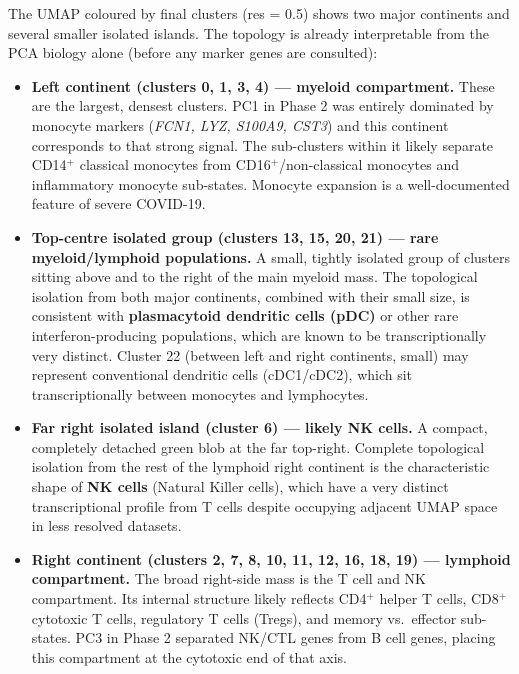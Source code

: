\documentclass[11pt, a4paper]{article}
\begin{document}
The UMAP coloured by final clusters (res = 0.5) shows two major continents and
several smaller isolated islands. The topology is already interpretable from the
PCA biology alone (before any marker genes are consulted):

\begin{itemize}[nosep]
  \item \textbf{Left continent (clusters 0, 1, 3, 4) — myeloid compartment.}
        These are the largest, densest clusters. PC1 in Phase 2 was entirely
        dominated by monocyte markers (\textit{FCN1, LYZ, S100A9, CST3}) and
        this continent corresponds to that strong signal. The sub-clusters within
        it likely separate CD14$^+$ classical monocytes from CD16$^+$/non-classical
        monocytes and inflammatory monocyte sub-states. Monocyte expansion is
        a well-documented feature of severe COVID-19.

  \item \textbf{Top-centre isolated group (clusters 13, 15, 20, 21) — rare
        myeloid/lymphoid populations.}
        A small, tightly isolated group of clusters sitting above and to the right
        of the main myeloid mass. The topological isolation from both major
        continents, combined with their small size, is consistent with
        \textbf{plasmacytoid dendritic cells (pDC)} or other rare interferon-producing
        populations, which are known to be transcriptionally very distinct.
        Cluster 22 (between left and right continents, small) may represent
        conventional dendritic cells (cDC1/cDC2), which sit transcriptionally
        between monocytes and lymphocytes.

  \item \textbf{Far right isolated island (cluster 6) — likely NK cells.}
        A compact, completely detached green blob at the far top-right. Complete
        topological isolation from the rest of the lymphoid right continent is
        the characteristic shape of \textbf{NK cells} (Natural Killer cells),
        which have a very distinct transcriptional profile from T cells despite
        occupying adjacent UMAP space in less resolved datasets.

  \item \textbf{Right continent (clusters 2, 7, 8, 10, 11, 12, 16, 18, 19) —
        lymphoid compartment.}
        The broad right-side mass is the T cell and NK compartment.
        Its internal structure likely reflects CD4$^+$ helper T cells, CD8$^+$
        cytotoxic T cells, regulatory T cells (Tregs), and memory vs.\ effector
        sub-states. PC3 in Phase 2 separated NK/CTL genes from B cell genes,
        placing this compartment at the cytotoxic end of that axis.


\end{itemize}
\end{document}

